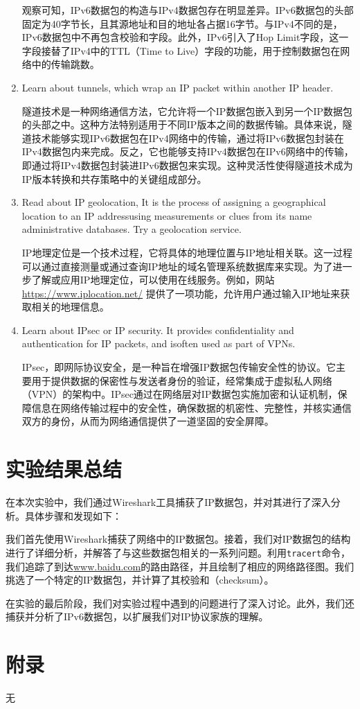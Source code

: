\documentclass{article}
\begin{document}
\begin{enumerate}[noitemsep]
		观察可知，IPv6数据包的构造与IPv4数据包存在明显差异。IPv6数据包的头部固定为40字节长，且其源地址和目的地址各占据16字节。与IPv4不同的是，IPv6数据包中不再包含校验和字段。此外，IPv6引入了Hop Limit字段，这一字段接替了IPv4中的TTL（Time to Live）字段的功能，用于控制数据包在网络中的传输跳数。
		
		\item Learn about tunnels, which wrap an IP packet within another IP header.
		
		隧道技术是一种网络通信方法，它允许将一个IP数据包嵌入到另一个IP数据包的头部之中。这种方法特别适用于不同IP版本之间的数据传输。具体来说，隧道技术能够实现IPv6数据包在IPv4网络中的传输，通过将IPv6数据包封装在IPv4数据包内来完成。反之，它也能够支持IPv4数据包在IPv6网络中的传输，即通过将IPv4数据包封装进IPv6数据包来实现。这种灵活性使得隧道技术成为IP版本转换和共存策略中的关键组成部分。
		
		\item Read about IP geolocation, It is the process of assigning a geographical location to an IP addressusing measurements or clues from its name administrative databases. Try a geolocation service.
		
		IP地理定位是一个技术过程，它将具体的地理位置与IP地址相关联。这一过程可以通过直接测量或通过查询IP地址的域名管理系统数据库来实现。为了进一步了解或应用IP地理定位，可以使用在线服务。例如，网站 \url{https://www.iplocation.net/} 提供了一项功能，允许用户通过输入IP地址来获取相关的地理信息。
		
		\item Learn about IPsec or IP security. It provides confidentiality and authentication for IP packets, and isoften used as part of VPNs.
		
		IPsec，即网际协议安全，是一种旨在增强IP数据包传输安全性的协议。它主要用于提供数据的保密性与发送者身份的验证，经常集成于虚拟私人网络（VPN）的架构中。IPsec通过在网络层对IP数据包实施加密和认证机制，保障信息在网络传输过程中的安全性，确保数据的机密性、完整性，并核实通信双方的身份，从而为网络通信提供了一道坚固的安全屏障。
		
	\end{enumerate}
	
	\section{实验结果总结}
	
	在本次实验中，我们通过Wireshark工具捕获了IP数据包，并对其进行了深入分析。具体步骤和发现如下：
	
	我们首先使用Wireshark捕获了网络中的IP数据包。接着，我们对IP数据包的结构进行了详细分析，并解答了与这些数据包相关的一系列问题。利用\texttt{tracert}命令，我们追踪了到达\url{www.baidu.com}的路由路径，并且绘制了相应的网络路径图。我们挑选了一个特定的IP数据包，并计算了其校验和（checksum）。
	
	在实验的最后阶段，我们对实验过程中遇到的问题进行了深入讨论。此外，我们还捕获并分析了IPv6数据包，以扩展我们对IP协议家族的理解。
	
	\section{附录}
	
	无
	
\end{document}
